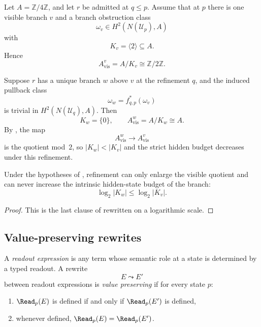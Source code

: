 \begin{example}\label{ex:refinement-drop}
Let $A=\mathbb Z/4\mathbb Z$, and let $r$ be admitted at $q\le p$.
Assume that at $p$ there is one visible branch $v$ and a branch obstruction class
\[
\omega_v\in H^2(N(\mathcal U_p),A)
\]
with
\[
K_v=\langle 2\rangle\subseteq A.
\]
Hence
\[
A_{\mathrm{vis}}^v=A/K_v\cong \mathbb Z/2\mathbb Z.
\]

Suppose $r$ has a unique branch $w$ above $v$ at the refinement $q$, and the induced pullback class
\[
\omega_w=f_{q,p}^*(\omega_v)
\]
is trivial in $H^2(N(\mathcal U_q),A)$. Then
\[
K_w=\{0\},\qquad A_{\mathrm{vis}}^w=A/K_w\cong A.
\]
By , the map
\[
A_{\mathrm{vis}}^w\longrightarrow A_{\mathrm{vis}}^v
\]
is the quotient mod~$2$, so $|K_w|<|K_v|$ and the strict hidden budget decreases under this refinement.
\end{example}

\begin{corollary}\label{cor:branch-budget-monotonicity}
Under the hypotheses of , refinement can only enlarge the visible quotient and can never increase the intrinsic hidden-state budget of the branch:
\[
\log_2|K_w|\le \log_2|K_v|.
\]
\end{corollary}

\begin{proof}
This is the last clause of  rewritten on a logarithmic scale.
\end{proof}

\subsection{Value-preserving rewrites}

\begin{definition}\label{def:value-preserving-rewrite}
A \emph{readout expression} is any term whose semantic role at a state is determined by a typed readout. A rewrite
\[
E\leadsto E'
\]
between readout expressions is \emph{value preserving} if for every state $p$:
\begin{enumerate}[label=(\roman*),nosep]
\item $\Read_p(E)$ is defined if and only if $\Read_p(E')$ is defined,
\item whenever defined, $\Read_p(E)=\Read_p(E')$.
\end{enumerate}
\end{definition}

